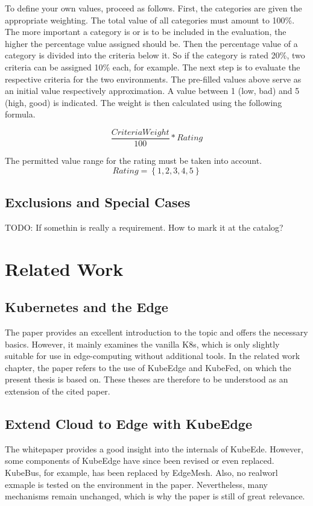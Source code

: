 \documentclass[MSC,Master,english]{twbook}%
\begin{document}
To define your own values, proceed as follows. First, the categories are given the appropriate weighting. The total value of all categories must amount to 100\%. The more important a category is or is to be included in the evaluation, the higher the percentage value assigned should be. Then the percentage value of a category is divided into the criteria below it. So if the category is rated 20\%, two criteria can be assigned 10\% each, for example. The next step is to evaluate the respective criteria for the two environments. The pre-filled values above serve as an initial value respectively approximation. A value between 1 (low, bad) and 5 (high, good) is indicated. The weight is then calculated using the following formula.

\begin{equation*}
    \frac{CriteriaWeight}{100}*Rating
\end{equation*}

The permitted value range for the rating must be taken into account.
\begin{equation*}
    Rating = \left\{1,2,3,4,5  \right\}
\end{equation*}

\section{Exclusions and Special Cases}
\label{sec:exclusions}
TODO: If somethin is really a requirement. How to mark it at the catalog?



\chapter{Related Work}
\label{chap:related}
\section{Kubernetes and the Edge}
The paper\cite{hal-kubeedge} provides an excellent introduction to the topic and offers the necessary basics. However, it mainly examines the vanilla \ac{K8s}, which is only slightly suitable for use in edge-computing without additional tools. In the related work chapter, the paper refers to the use of KubeEdge and KubeFed, on which the present thesis is based on. These theses are therefore to be understood as an extension of the cited paper.

\section{Extend Cloud to Edge with KubeEdge}
The whitepaper\cite{kubedge} provides a good insight into the internals of KubeEde. However, some components of KubeEdge have since been revised or even replaced. KubeBus, for example, has been replaced by EdgeMesh. Also, no realworl exmaple is tested on the environment in the paper. Nevertheless, many mechanisms remain unchanged, which is why the paper is still of great relevance.
\end{document}
